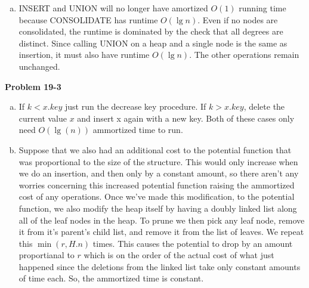 \documentclass{article}
\begin{document}
\begin{enumerate}[a.]
\item INSERT and UNION will no longer have amortized $O(1)$ running time because CONSOLIDATE has runtime $O(\lg n)$.  Even if no nodes are consolidated, the runtime is dominated by the check that all degrees are distinct.  Since calling UNION on a heap and a single node is the same as insertion, it must also have runtime $O(\lg n)$.  The other operations remain unchanged. \\
\end{enumerate}

\noindent\textbf{Problem 19-3}\\
\begin{enumerate}[a.]
\item
If $k<x.key$ just run the decrease key procedure. If $k>x.key$, delete the current value $x$ and insert x again with a new key. Both of these cases only need $O(\lg(n))$ ammortized time to run.
\item
Suppose that we also had an additional cost to the potential function that was proportional to the size of the structure. This would only increase when we do an insertion, and then only by a constant amount, so there aren't any worries concerning this increased potential function raising the ammortized cost of any operations. Once we've made this modification, to the potential function, we also modify the heap itself by having a doubly linked list along all of the leaf nodes in the heap. To prune we then pick any leaf node, remove it from it's parent's child list, and remove it from the list of leaves. We repeat this $\min(r,H.n)$ times. This causes the potential to drop by an amount proportianal to $r$ which is on the order of the actual cost of what just happened since the deletions from the linked list take only constant amounts of time each. So, the ammortized time is constant.\\

\end{enumerate}
\end{document}
